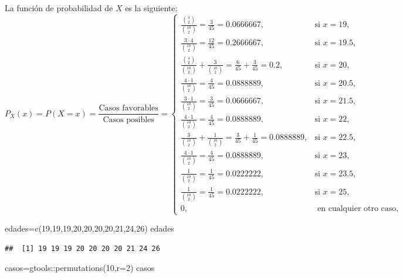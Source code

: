 \documentclass[
]{article}
\newenvironment{Shaded}{\begin{snugshade}}{\end{snugshade}}
\newcommand{\AttributeTok}[1]{\textcolor[rgb]{0.77,0.63,0.00}{#1}}
\newcommand{\DecValTok}[1]{\textcolor[rgb]{0.00,0.00,0.81}{#1}}
\newcommand{\FunctionTok}[1]{\textcolor[rgb]{0.00,0.00,0.00}{#1}}
\newcommand{\NormalTok}[1]{#1}
\newcommand{\OtherTok}[1]{\textcolor[rgb]{0.56,0.35,0.01}{#1}}
\newcommand{\SpecialCharTok}[1]{\textcolor[rgb]{0.00,0.00,0.00}{#1}}
\begin{document}
La función de probabilidad de \(X\) es la siguiente: \[
P_X(x)=P(X=x)=\frac{\mbox{Casos favorables}}{\mbox{Casos posibles}}=
\left\{\begin{array}{ll}
\frac{\binom{3}{2}}{\binom{10}{2}}=\frac{3}{45}=0.0666667, & \mbox{si } x=19,
 \\[0.25cm]
\frac{3\cdot 4}{\binom{10}{2}}=\frac{12}{45}=0.2666667, & \mbox{si } x=19.5,
 \\[0.25cm]
 \frac{\binom{4}{2}}{\binom{10}{2}}+\frac{3}{\binom{10}{2}}=\frac{6}{45}+\frac{3}{45}=0.2, & \mbox{si } x=20,
 \\[0.25cm]
 \frac{4\cdot 1}{\binom{10}{2}}=\frac{4}{45}=0.0888889, & \mbox{si } x=20.5,
 \\[0.25cm]
 \frac{3\cdot 1}{\binom{10}{2}}=\frac{3}{45}=0.0666667, & \mbox{si } x=21.5,
 \\[0.25cm]
 \frac{4\cdot 1}{\binom{10}{2}}=\frac{4}{45}=0.0888889, & \mbox{si } x=22,
 \\[0.25cm]
 \frac{3}{\binom{10}{2}}+\frac{1}{\binom{10}{2}}=\frac{3}{45}+\frac{1}{45}=0.0888889, & \mbox{si } x=22.5,
 \\[0.25cm]
 \frac{4\cdot 1}{\binom{10}{2}}=\frac{4}{45}=0.0888889, & \mbox{si } x=23,
 \\[0.25cm]
 \frac{1}{\binom{10}{2}}=\frac{1}{45}=0.0222222, & \mbox{si } x=23.5,
 \\[0.25cm]
 \frac{1}{\binom{10}{2}}=\frac{1}{45}=0.0222222, & \mbox{si } x=25,
 \\[0.25cm]
0, & \mbox{ en cualquier otro caso},
\end{array}\right.
\]

\begin{Shaded}
\begin{Highlighting}[]
\NormalTok{edades}\OtherTok{=}\FunctionTok{c}\NormalTok{(}\DecValTok{19}\NormalTok{,}\DecValTok{19}\NormalTok{,}\DecValTok{19}\NormalTok{,}\DecValTok{20}\NormalTok{,}\DecValTok{20}\NormalTok{,}\DecValTok{20}\NormalTok{,}\DecValTok{20}\NormalTok{,}\DecValTok{21}\NormalTok{,}\DecValTok{24}\NormalTok{,}\DecValTok{26}\NormalTok{)}
\NormalTok{edades}
\end{Highlighting}
\end{Shaded}

\begin{verbatim}
##  [1] 19 19 19 20 20 20 20 21 24 26
\end{verbatim}

\begin{Shaded}
\begin{Highlighting}[]
\NormalTok{casos}\OtherTok{=}\NormalTok{gtools}\SpecialCharTok{::}\FunctionTok{permutations}\NormalTok{(}\DecValTok{10}\NormalTok{,}\AttributeTok{r=}\DecValTok{2}\NormalTok{)}
\NormalTok{casos}
\end{Highlighting}
\end{Shaded}
\end{document}
